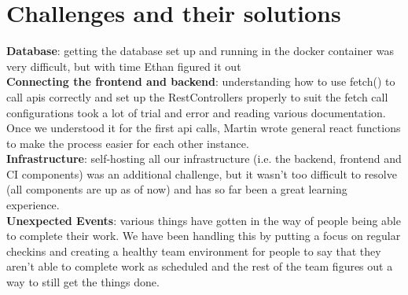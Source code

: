 \section{Challenges and their solutions}
\textbf{Database}: getting the database set up and running in the docker container was very difficult, but with time Ethan figured it out \\
\textbf{Connecting the frontend and backend}: understanding how to use fetch() to call apis correctly and set up the RestControllers properly to suit the fetch call configurations took a lot of trial and error and reading various documentation. Once we understood it for the first api calls, Martin wrote general react functions to make the process easier for each other instance. \\
\textbf{Infrastructure}: self-hosting all our infrastructure (i.e. the backend, frontend and CI components) was an additional challenge, but it wasn't too difficult to resolve (all components are up as of now) and has so far been a great learning experience. \\
\textbf{Unexpected Events}: various things have gotten in the way of people being able to complete their work.
We have been handling this by putting a focus on regular checkins and creating a healthy team environment for people to say that they aren't able to complete work as scheduled and the rest of the team figures out a way to still get the things done. 
